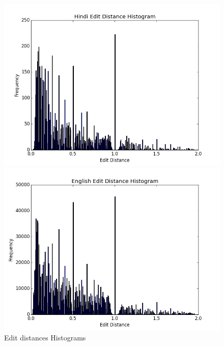 \documentclass[11pt,a4paper]{article}
\begin{document}
\begin{figure}[!htb]
	\centering
    \begin{minipage}{.5\textwidth}
        \centering
        \includegraphics[width=1.0\linewidth]{hi_edit_hist.png}
    \end{minipage}%
    \begin{minipage}{0.5\textwidth}
        \centering
        \includegraphics[width=1.0\linewidth]{en_edit_hist.png}
    \end{minipage}
    \caption{Edit distances Histograms}
    \label{fig:edit_hist}
\end{figure}
\end{document}
